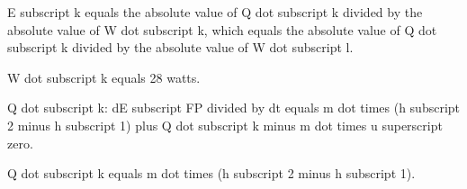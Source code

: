 E subscript k equals the absolute value of Q dot subscript k divided by the absolute value of W dot subscript k, which equals the absolute value of Q dot subscript k divided by the absolute value of W dot subscript l.  

W dot subscript k equals 28 watts.  

Q dot subscript k:  
dE subscript FP divided by dt equals m dot times (h subscript 2 minus h subscript 1) plus Q dot subscript k minus m dot times u superscript zero.  

Q dot subscript k equals m dot times (h subscript 2 minus h subscript 1).